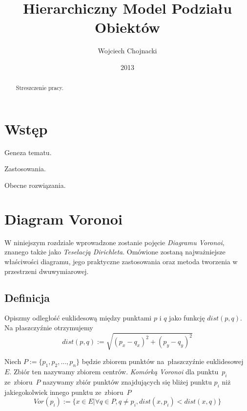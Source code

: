 \documentclass[skorowidz,autorrok,backref,xodstep,oswiadczenie]{wmimgr}
\author   {Wojciech Chojnacki}
\title    {Hierarchiczny Model Podziału Obiektów}
\date     {2013}
\begin{document}
\nocite{*} %

\begin{abstract}

Streszczenie pracy.

\end{abstract}

\maketitle

%
%
\listoffigures

%

%
\chapter{Wstęp}

Geneza tematu.

Zastosowania.

Obecne rozwiązania.


\chapter{Diagram Voronoi}

W niniejszym rozdziale wprowadzone zostanie pojęcie \emph{Diagramu Voronoi}, znanego także jako \emph{Teselacją Dirichleta}. Omówione zostaną najważniejsze właściwości diagramu, jego praktyczne zastosowania oraz metoda tworzenia w przestrzeni dwuwymiarowej.

\section{Definicja}

Opiszmy odległość euklidesową między punktami $p$ i $q$ jako funkcję $dist(p,q)$. Na płaszczyźnie otrzymujemy
\begin{equation}
dist(p,q) := \sqrt{( p_{x} - q_{x} )^2 + (p_{y} - q_{y})^2}
\end{equation}

Niech $P:=\{ p_{1},p_{2},...,p_{n} \}$ będzie zbiorem punktów na~płaszczyźnie euklidesowej $E$. Zbiór ten nazywamy zbiorem centrów. \emph{Komórką Voronoi} dla punktu~$p_{i}$ ze~zbioru~$P$ nazywamy zbiór punktów znajdujących się bliżej punktu $p_{i}$ niż jakiegokolwiek innego punktu ze~zbioru~$P$
\begin{equation}
Vor(p_{i}) := \{ x \in E | \forall q \in P, q \neq p_{i}, dist(x,p_{i}) < dist(x,q) \}
\end{equation}
\end{document}
